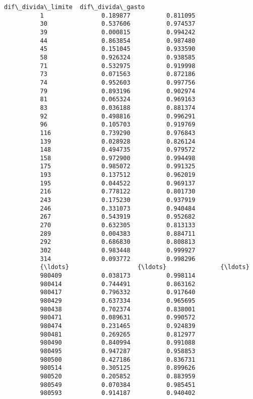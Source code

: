 \documentclass[11pt]{article}
\begin{document}
\begin{Verbatim}[commandchars=\\\{\}]
                  dif\_divida\_limite  dif\_divida\_gasto  
          1                0.189877          0.811095  
          30               0.537606          0.974537  
          39               0.000815          0.994242  
          44               0.863854          0.987480  
          45               0.151045          0.933590  
          58               0.926324          0.938585  
          71               0.532975          0.919998  
          73               0.071563          0.872186  
          74               0.952603          0.997756  
          79               0.893196          0.902974  
          81               0.065324          0.969163  
          83               0.036188          0.881374  
          92               0.498816          0.996291  
          96               0.105703          0.919769  
          116              0.739290          0.976843  
          139              0.028928          0.826124  
          148              0.494735          0.979572  
          158              0.972900          0.994498  
          175              0.985072          0.991325  
          193              0.137512          0.962019  
          195              0.044522          0.969137  
          216              0.778122          0.801730  
          243              0.175230          0.937919  
          246              0.331073          0.940484  
          267              0.543919          0.952682  
          270              0.632305          0.813133  
          289              0.004383          0.884711  
          292              0.686830          0.808813  
          302              0.983448          0.999927  
          314              0.093772          0.998296  
          {\ldots}                   {\ldots}               {\ldots}  
          980409           0.038173          0.998114  
          980414           0.744491          0.863162  
          980417           0.796332          0.917640  
          980429           0.637334          0.965695  
          980438           0.702374          0.838001  
          980471           0.089631          0.990572  
          980474           0.231465          0.924839  
          980481           0.269265          0.812977  
          980490           0.840994          0.991088  
          980495           0.947287          0.958853  
          980500           0.427186          0.836731  
          980514           0.305125          0.899626  
          980520           0.205852          0.883959  
          980549           0.070384          0.985451  
          980593           0.914187          0.940402  

\end{Verbatim}
\end{document}
